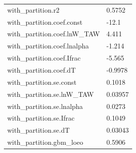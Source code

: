 {\begin{longtable}{p{}p{}}
{}with\_partition.r2 & 0.5752\\
{}with\_partition.coef.const & -12.1\\
{}with\_partition.coef.lnW\_TAW & 4.411\\
{}with\_partition.coef.lnalpha & -1.214\\
{}with\_partition.coef.Ifrac & -5.565\\
{}with\_partition.coef.dT & -0.9978\\
{}with\_partition.se.const & 0.1018\\
{}with\_partition.se.lnW\_TAW & 0.03957\\
{}with\_partition.se.lnalpha & 0.0273\\
{}with\_partition.se.Ifrac & 0.1049\\
{}with\_partition.se.dT & 0.03043\\
{}with\_partition.gbm\_loeo & 0.5906\\
\bottomrule\end{longtable}}

